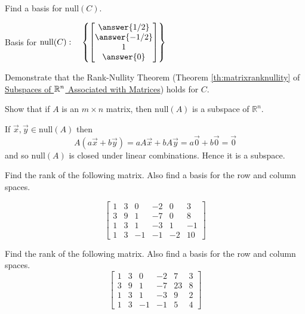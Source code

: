 \documentclass{ximera}
\begin{document}
\begin{problem}
\begin{problem}\label{prob:nullABC3}
Find a basis for $\mbox{null}(C)$.
\end{problem}

Basis for $\mbox{null}(C):\quad \left\{ \begin{bmatrix}\answer{1/2}\\\answer{-1/2}\\1\\\answer{0}\end{bmatrix}\right\}$

\begin{problem}\label{prob:rank-nullityABC3}
Demonstrate that the Rank-Nullity Theorem (Theorem \ref{th:matrixranknullity} of \href{https://ximera.osu.edu/oerlinalg/LinearAlgebra/VSP-0040/main}{Subspaces of $\mathbb{R}^n$ Associated with Matrices}) 
holds for $C$.
\end{problem}
\end{problem}




\begin{problem}\label{prb:5.31} Show that if $A$ is an $m\times n$ matrix, then $\mbox{null} \left( A\right) $
is a subspace of $\mathbb{R}^n$.
\begin{hint}
If $\vec{x},\vec{y}\in \mbox{null} \left( A\right) $ then
\[
A\left( a\vec{x}+b\vec{y}\right) =aA\vec{x}+bA\vec{y}=a\vec{0}
+b\vec{0}=\vec{0}
\]
and so $\mbox{null} \left( A\right) $ is closed under linear combinations. Hence it
is a subspace.
\end{hint}
\end{problem}

\begin{problem}\label{prb:5.32} Find the rank of the following matrix. Also find a basis for the row
and column spaces.

\begin{equation*}
\left[
\begin{array}{rrrrrr}
1 & 3 & 0 & -2 & 0 & 3 \\
3 & 9 & 1 & -7 & 0 & 8 \\
1 & 3 & 1 & -3 & 1 & -1 \\
1 & 3 & -1 & -1 & -2 & 10
\end{array}
\right]
\end{equation*}
\end{problem}

\begin{problem}\label{prb:5.33} Find the rank of the following matrix. Also find a basis for the row
and column spaces.
\begin{equation*}
\left[
\begin{array}{rrrrrr}
1 & 3 & 0 & -2 & 7 & 3 \\
3 & 9 & 1 & -7 & 23 & 8 \\
1 & 3 & 1 & -3 & 9 & 2 \\
1 & 3 & -1 & -1 & 5 & 4
\end{array}
\right]
\end{equation*}
\end{problem}
\end{document}

